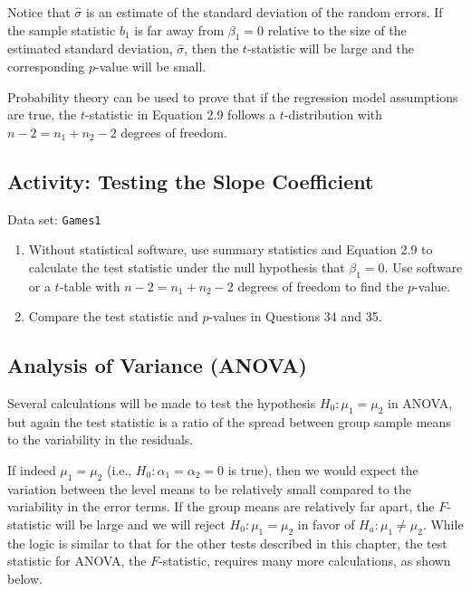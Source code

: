 \documentclass[
]{book}
\begin{document}
Notice that \(\hat{\sigma}\) is an estimate of the standard deviation of the random errors. If the sample statistic \(b_1\) is far away from \(\beta_1 = 0\) relative to the size of the estimated standard deviation, \(\hat{\sigma}\), then the \(t\)-statistic will be large and the corresponding \(p\)-value will be small.

Probability theory can be used to prove that if the regression model assumptions are true, the \(t\)-statistic in Equation 2.9 follows a \(t\)-distribution with \(n - 2 = n_1 + n_2 - 2\) degrees of freedom.

\hypertarget{activity-testing-the-slope-coefficient}{%
\subsection*{Activity: Testing the Slope Coefficient}\label{activity-testing-the-slope-coefficient}}

Data set: \texttt{Games1}

\begin{enumerate}
\def\labelenumi{\arabic{enumi}.}
\setcounter{enumi}{34}
\item
  Without statistical software, use summary statistics and Equation 2.9 to calculate the test statistic under the null hypothesis that \(\beta_1 = 0\). Use software or a \(t\)-table with \(n - 2 = n_1 + n_2 - 2\) degrees of freedom to find the \(p\)-value.
\item
  Compare the test statistic and \(p\)-values in Questions 34 and 35.
\end{enumerate}

\hypertarget{analysis-of-variance-anova}{%
\subsection*{Analysis of Variance (ANOVA)}\label{analysis-of-variance-anova}}

Several calculations will be made to test the hypothesis \(H_0\!:\! \mu_1 = \mu_2\) in ANOVA, but again the test statistic is a ratio of the spread between group sample means to the variability in the residuals.

If indeed \(\mu_1 = \mu_2\) (i.e., \(H_0\!:\! \alpha_1 = \alpha_2 = 0\) is true), then we would expect the variation between the level means to be relatively small compared to the variability in the error terms. If the group means are relatively far apart, the \(F\)-statistic will be large and we will reject \(H_0\!:\! \mu_1 = \mu_2\) in favor of \(H_a\!:\! \mu_1 \ne \mu_2\). While the logic is similar to that for the other tests described in this chapter, the test statistic for ANOVA, the \(F\)-statistic, requires many more calculations, as shown below.
\end{document}
